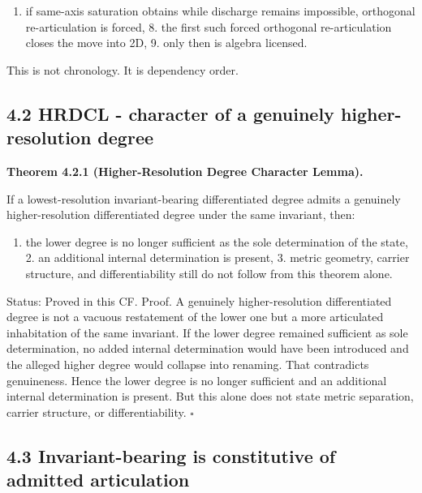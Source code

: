 \documentclass[11pt]{article}
\providecommand{\tightlist}{%
  \setlength{\itemsep}{1pt}\setlength{\parskip}{0pt}}
\begin{document}
\begin{enumerate}
\def\labelenumi{\arabic{enumi}.}
\setcounter{enumi}{6}
\tightlist
\item
  if same-axis saturation obtains while discharge remains impossible, orthogonal re-articulation is forced, 8. the first such forced orthogonal re-articulation closes the move into 2D, 9. only then is algebra licensed.
\end{enumerate}

This is not chronology. It is dependency order.

\subsection{4.2 HRDCL - character of a genuinely higher-resolution degree}\label{hrdcl---character-of-a-genuinely-higher-resolution-degree}

\textbf{Theorem 4.2.1 (Higher-Resolution Degree Character Lemma).}

If a lowest-resolution invariant-bearing differentiated degree admits a genuinely higher-resolution differentiated degree under the same invariant, then:

\begin{enumerate}
\def\labelenumi{\arabic{enumi}.}
\tightlist
\item
  the lower degree is no longer sufficient as the sole determination of the state, 2. an additional internal determination is present, 3. metric geometry, carrier structure, and differentiability still do not follow from this theorem alone.
\end{enumerate}

Status: Proved in this CF. Proof. A genuinely higher-resolution differentiated degree is not a vacuous restatement of the lower one but a more articulated inhabitation of the same invariant. If the lower degree remained sufficient as sole determination, no added internal determination would have been introduced and the alleged higher degree would collapse into renaming. That contradicts genuineness. Hence the lower degree is no longer sufficient and an additional internal determination is present. But this alone does not state metric separation, carrier structure, or differentiability. $\square$

\subsection{4.3 Invariant-bearing is constitutive of admitted articulation}\label{invariant-bearing-is-constitutive-of-admitted-articulation}
\end{document}
